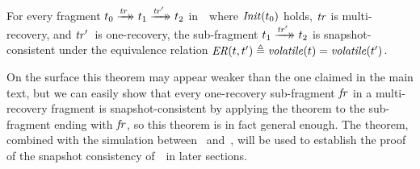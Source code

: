 \begin{theorem}\label{cdS}
For every fragment $t_0 \xrightarrow{\mathit{tr}}\mathrel{\mkern-14mu}\rightarrow_{} t_1 \xrightarrow{\mathit{tr}'}\mathrel{\mkern-14mu}\rightarrow_{} t_2$ in~\Spec\ where $\mathit{Init}(t_0)$ holds, $\mathit{tr}$ is multi-recovery, and $\mathit{tr}'$~is one-recovery, the sub-fragment $t_1 \xrightarrow{\mathit{tr'}}\mathrel{\mkern-14mu}\rightarrow_{} t_2$ is snapshot-consistent under the equivalence relation $\mathit{ER}(t, t') {}\triangleq{} \mathit{volatile}(t) = \mathit{volatile}(t')$.
\end{theorem}

On the surface this theorem may appear weaker than the one claimed in the main text, but we can easily show that every one-recovery sub-fragment $\mathit{fr}$ in a multi-recovery fragment is snapshot-consistent by applying the theorem to the sub-fragment ending with $\mathit{fr}$, so this theorem is in fact general enough.
The theorem, combined with the simulation between \Spec~and~\ProgInv, will be used to establish the proof of the snapshot consistency of~\ProgInv\ in later sections.